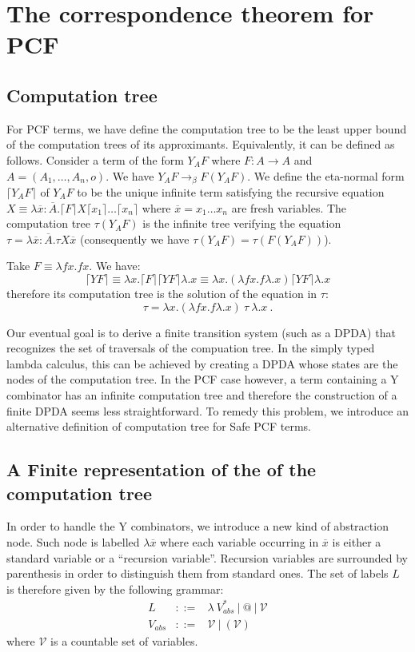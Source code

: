 \documentclass{article}
\newcommand{\aux}[1]{\lceil #1\rceil}
\newcommand{\betared}{\rightarrow_\beta}
\newcommand{\syneq}{\equiv}
\begin{document}
\section{The correspondence theorem for PCF}

\subsection{Computation tree}
For PCF terms, we have define the computation tree to be the least upper bound of the computation trees of its approximants. Equivalently, it can be defined as follows. Consider a term of the form $Y_A F$ where $F:A\rightarrow A$ and $A = (A_1,\ldots,A_n,o)$.
We have $Y_A F \betared F (Y_A F)$.
We define the eta-normal form $\aux{Y_A F}$ of $Y_A F$ to be the unique infinite term satisfying the recursive equation $X \syneq \lambda \overline{x}: \overline{A} . \aux{F} X \aux{x_1} \ldots \aux{x_n} $
where $\overline{x} = x_1 \ldots x_n$ are fresh variables.
The computation tree $\tau(Y_A F)$ is the infinite tree verifying the equation 
$\tau =  \lambda \overline{x}: \overline{A} . \tau X \overline{x}$ (consequently we have $\tau(Y_A F) = \tau(F (Y_A F))$).

Take $F \syneq \lambda f x. f x$. We have:
$$\aux{Y F} \syneq \lambda x . \aux{F} \aux{Y F} \lambda.x \syneq \lambda x. (\lambda f x. f \lambda.x ) \aux{Y F} \lambda.x$$ therefore its computation tree is the solution of the equation in $\tau$: $$\tau = \lambda x . (\lambda f x. f \lambda.x) \ \tau \ \lambda.x \ .$$


Our eventual goal is to derive a finite transition system (such as a DPDA) that recognizes the set of traversals of the compuation tree. In the simply typed lambda calculus, this can be achieved by creating a DPDA whose states are the nodes of the computation tree.
In the PCF case however, a term containing a Y combinator has an infinite computation tree and therefore the construction of a finite DPDA seems less straightforward.
To remedy this problem, we introduce an alternative definition of computation tree for Safe PCF terms.

\subsection{A Finite representation of the of the computation tree}

In order to handle the Y combinators, we introduce a new kind of abstraction node. Such node is labelled $\lambda \overline{x}$ where each variable occurring in $\overline{x}$ is either a standard variable or a ``recursion variable''.
Recursion variables are surrounded by parenthesis in order to distinguish them from standard ones. The set of labels $L$ is therefore given by the following grammar:
\begin{eqnarray*}
L &::=& \lambda\ V_{abs}^*\ |\ @\ |\ \mathcal{V} \\
V_{abs} &::=& \mathcal{V}\ |\ (\mathcal{V})
\end{eqnarray*}
where $\mathcal{V}$ is a countable set of variables.
\end{document}

